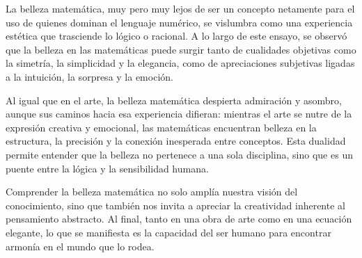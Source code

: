 \documentclass[twocolumn]{article}
\begin{document}
La belleza matemática, muy pero muy lejos de ser un concepto netamente para el uso de quienes dominan el lenguaje numérico, se vislumbra como una experiencia estética que trasciende lo lógico o racional. A lo largo de este ensayo, se observó que la belleza en las matemáticas puede surgir tanto de cualidades objetivas como la simetría, la simplicidad y la elegancia, como de apreciaciones subjetivas ligadas a la intuición, la sorpresa y la emoción.

Al igual que en el arte, la belleza matemática despierta admiración y asombro, aunque sus caminos hacia esa experiencia difieran: mientras el arte se nutre de la expresión creativa y emocional, las matemáticas encuentran belleza en la estructura, la precisión y la conexión inesperada entre conceptos. Esta dualidad permite entender que la belleza no pertenece a una sola disciplina, sino que es un puente entre la lógica y la sensibilidad humana.

Comprender la belleza matemática no solo amplía nuestra visión del conocimiento, sino que también nos invita a apreciar la creatividad inherente al pensamiento abstracto. Al final, tanto en una obra de arte como en una ecuación elegante, lo que se manifiesta es la capacidad del ser humano para encontrar armonía en el mundo que lo rodea.



\end{document}
